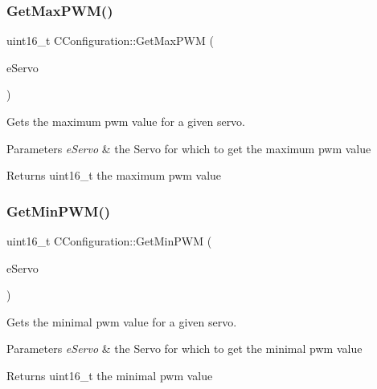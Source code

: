 \subsubsection{\texorpdfstring{Get\+Max\+P\+W\+M()}{GetMaxPWM()}}
{\footnotesize\ttfamily uint16\+\_\+t C\+Configuration\+::\+Get\+Max\+P\+WM (\begin{DoxyParamCaption}\item[{e\+Servos}]{e\+Servo }\end{DoxyParamCaption})}



Gets the maximum pwm value for a given servo. 


\begin{DoxyParams}{Parameters}
{\em e\+Servo} & the Servo for which to get the maximum pwm value \\
\hline
\end{DoxyParams}
\begin{DoxyReturn}{Returns}
uint16\+\_\+t the maximum pwm value 
\end{DoxyReturn}
\mbox{\label{classCConfiguration_a8c403f01f00fa41c5cfa1b7b7fc54643}} 
\subsubsection{\texorpdfstring{Get\+Min\+P\+W\+M()}{GetMinPWM()}}
{\footnotesize\ttfamily uint16\+\_\+t C\+Configuration\+::\+Get\+Min\+P\+WM (\begin{DoxyParamCaption}\item[{e\+Servos}]{e\+Servo }\end{DoxyParamCaption})}



Gets the minimal pwm value for a given servo. 


\begin{DoxyParams}{Parameters}
{\em e\+Servo} & the Servo for which to get the minimal pwm value \\
\hline
\end{DoxyParams}
\begin{DoxyReturn}{Returns}
uint16\+\_\+t the minimal pwm value 
\end{DoxyReturn}
\mbox{\label{classCConfiguration_aeaa35322a42eb0fb16f04d43f98ee9af}} 
